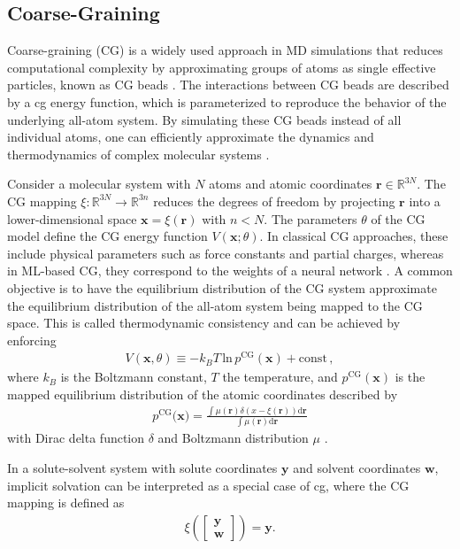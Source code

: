 \subsection{Coarse-Graining}
\label{cg}

Coarse-graining (CG) is a widely used approach in MD simulations that reduces computational complexity by approximating groups of atoms as single effective particles, known as CG beads \citep{cgInBioSims}. The interactions between CG beads are described by a \gls{cg} energy function, which is parameterized to reproduce the behavior of the underlying all-atom system. By simulating these CG beads instead of all individual atoms, one can efficiently approximate the dynamics and thermodynamics of complex molecular systems \citep{cgReviewNoid}.

Consider a molecular system with \(N\) atoms and atomic coordinates \(\mathbf{r} \in \mathbb{R}^{3N}\). The CG mapping \(\xi: \mathbb{R}^{3N} \to \mathbb{R}^{3n}\) reduces the degrees of freedom by projecting \(\mathbf{r}\) into a lower-dimensional space $\mathbf{x}=\xi(\mathbf{r})$ with $n<N$. The parameters $\theta$ of the CG model define the CG energy function $V(\mathbf{x}; \theta)$. In classical CG approaches, these include physical parameters such as force constants and partial charges, whereas in ML-based CG, they correspond to the weights of a neural network \citep{cgBasics}. A common objective is to have the equilibrium distribution of the CG system approximate the equilibrium distribution of the all-atom system being mapped to the CG space. This is called thermodynamic consistency and can be achieved by enforcing 
\begin{align}
    V(\mathbf{x}, \theta) \equiv -k_B T \,\text{ln} \, p^{\text{CG}}(\mathbf{x}) + \text{const} \, ,
\end{align}
where $k_B$ is the Boltzmann constant, $T$ the temperature, and $p^{\text{CG}}(\mathbf{x})$ is the mapped equilibrium distribution of the atomic coordinates described by
\begin{align}
    p^{\text{CG}}(\mathbf{x)} = \frac{\int \mu (\mathbf{r}) \delta(x - \xi(\mathbf{r})) \text{d}\mathbf{r}}{\int \mu (\mathbf{r}) \text{d} \mathbf{r}}
\end{align}
with Dirac delta function $\delta$ and Boltzmann distribution $\mu$ \citep{cgBasics}.

In a solute-solvent system with solute coordinates $\mathbf{y}$ and solvent coordinates $\mathbf{w}$, implicit solvation can be interpreted as a special case of \gls{cg}, where the CG mapping is defined as
\begin{align}
    \xi\left( 
\begin{bmatrix}
\mathbf{y} \\
\mathbf{w}
\end{bmatrix}
\right) = \mathbf{y}.
\end{align}

